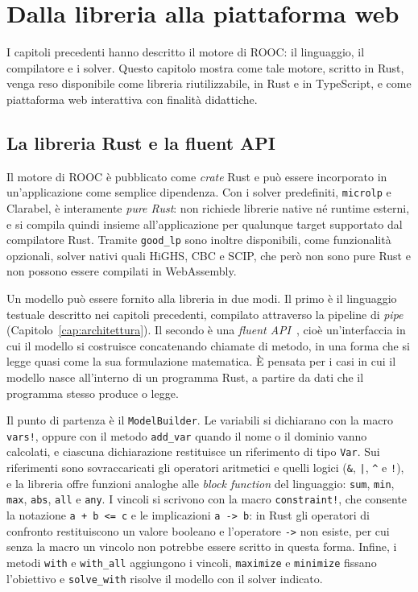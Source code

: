 
\chapter{Dalla libreria alla piattaforma web}
\label{cap:piattaforma}

I capitoli precedenti hanno descritto il motore di ROOC: il linguaggio, il
compilatore e i solver. Questo capitolo mostra come tale motore, scritto in Rust,
venga reso disponibile come libreria riutilizzabile, in Rust e in TypeScript, e
come piattaforma web interattiva con finalità didattiche.

\section{La libreria Rust e la fluent API}
\label{sec:fluent-api}

Il motore di ROOC è pubblicato come \emph{crate} Rust e può essere incorporato in
un'applicazione come semplice dipendenza. Con i solver predefiniti,
\texttt{microlp} e Clarabel, è interamente \emph{pure Rust}: non richiede
librerie native né runtime esterni, e si compila quindi insieme all'applicazione
per qualunque target supportato dal compilatore Rust. Tramite
\texttt{good\_lp} sono inoltre disponibili, come funzionalità opzionali, solver
nativi quali HiGHS, CBC e SCIP, che però non sono pure Rust e non possono essere
compilati in WebAssembly.

Un modello può essere fornito alla libreria in due modi. Il primo è il
linguaggio testuale descritto nei capitoli precedenti, compilato attraverso la
pipeline di \emph{pipe} (Capitolo~\ref{cap:architettura}). Il secondo è una
\emph{fluent API}~\cite{fowler2005}, cioè un'interfaccia in cui il modello si
costruisce concatenando chiamate di metodo, in una forma che si legge quasi come
la sua formulazione matematica. È pensata per i casi in cui il modello nasce
all'interno di un programma Rust, a partire da dati che il programma stesso
produce o legge.

Il punto di partenza è il \texttt{ModelBuilder}. Le variabili si dichiarano con
la macro \texttt{vars!}, oppure con il metodo \texttt{add\_var} quando il nome o
il dominio vanno calcolati, e ciascuna dichiarazione restituisce un riferimento
di tipo \texttt{Var}. Sui riferimenti sono sovraccaricati gli operatori
aritmetici e quelli logici (\texttt{\&}, \texttt{|}, \texttt{\^{}} e
\texttt{!}), e la libreria offre funzioni analoghe alle \emph{block function}
del linguaggio: \texttt{sum}, \texttt{min}, \texttt{max}, \texttt{abs},
\texttt{all} e \texttt{any}. I vincoli si scrivono con la macro \texttt{constraint!}, che
consente la notazione \texttt{a + b <= c} e le implicazioni \texttt{a -> b}: in
Rust gli operatori di confronto restituiscono un valore booleano e l'operatore
\texttt{->} non esiste, per cui senza la macro un vincolo non potrebbe essere
scritto in questa forma. Infine, i metodi \texttt{with} e \texttt{with\_all}
aggiungono i vincoli, \texttt{maximize} e \texttt{minimize} fissano l'obiettivo e
\texttt{solve\_with} risolve il modello con il solver indicato.

